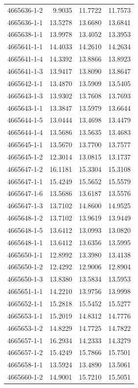\begin{longtable}{lrrr}
4665636-1-2 & 9.9035 & 11.7722 & 11.7573 \\
4665636-1-1 & 13.5278 & 13.6680 & 13.6841 \\
4665638-1-1 & 13.9978 & 13.4052 & 13.3953 \\
4665641-1-1 & 14.4033 & 14.2610 & 14.2634 \\
4665641-1-4 & 14.3392 & 13.8866 & 13.8923 \\
4665641-1-3 & 13.9417 & 13.8090 & 13.8647 \\
4665642-1-1 & 13.4870 & 13.5909 & 13.5405 \\
4665643-1-3 & 13.9302 & 13.7608 & 13.7693 \\
4665643-1-1 & 13.3847 & 13.5979 & 13.6644 \\
4665644-1-5 & 13.0444 & 13.4698 & 13.4479 \\
4665644-1-4 & 13.5686 & 13.5635 & 13.4683 \\
4665645-1-1 & 13.5670 & 13.7700 & 13.7577 \\
4665645-1-2 & 12.3014 & 13.0815 & 13.1737 \\
4665647-1-2 & 16.1181 & 15.3304 & 15.3108 \\
4665647-1-1 & 15.4249 & 15.5652 & 15.5579 \\
4665647-1-6 & 13.5686 & 13.6187 & 13.5576 \\
4665647-1-3 & 13.7102 & 14.8600 & 14.9525 \\
4665648-1-2 & 13.7102 & 13.9619 & 13.9449 \\
4665648-1-5 & 13.6412 & 13.0993 & 13.0820 \\
4665648-1-1 & 13.6412 & 13.6356 & 13.5995 \\
4665650-1-1 & 12.8992 & 13.3980 & 13.4138 \\
4665650-1-2 & 12.4292 & 12.9006 & 12.8904 \\
4665650-1-3 & 13.8380 & 13.5834 & 13.5953 \\
4665651-1-1 & 14.2210 & 13.9756 & 13.9998 \\
4665652-1-1 & 15.2818 & 15.5452 & 15.5277 \\
4665653-1-1 & 15.2019 & 14.8312 & 14.7776 \\
4665653-1-2 & 14.8229 & 14.7725 & 14.7822 \\
4665657-1-1 & 16.2934 & 14.2333 & 14.3279 \\
4665657-1-2 & 15.4249 & 15.7866 & 15.7501 \\
4665658-1-1 & 13.5924 & 13.4890 & 13.5061 \\
4665660-1-2 & 14.9001 & 15.7210 & 15.5051 \\

\end{longtable}
